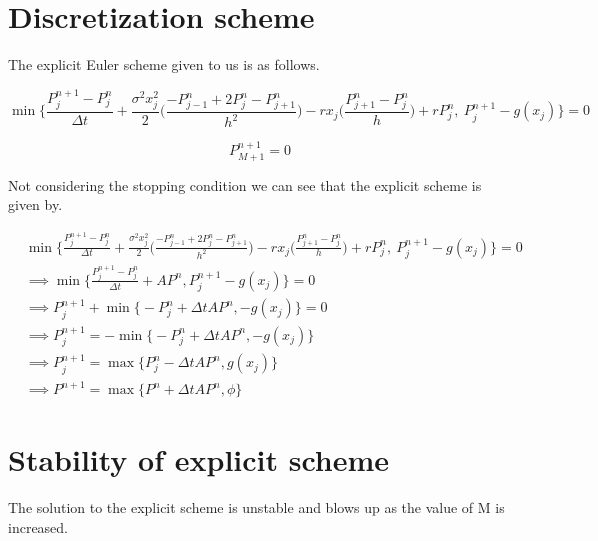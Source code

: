 \documentclass[12pt]{report}
\begin{document}
\section*{Discretization scheme}

The explicit Euler scheme given to us is as follows. 

\begin{equation*}
\min{\bigg\{\frac{P_j^{n+1}-P_j^{n}}{\Delta t}+\frac{\sigma^2x_j^2}{2}\bigg(\frac{-P^n_{j-1}+2P^n_{j}-P^n_{j+1}}{h^2}\bigg)-rx_j\bigg(\frac{P^n_{j+1}-P^n_{j}}{h}\bigg)+rP^n_{j},\ P_j^{n+1}-g(x_j)\bigg\}}=0
\end{equation*}

\begin{equation*}
P_{M+1}^{n+1}=0
\end{equation*}

Not considering the stopping condition we can see that the explicit scheme is given by. 

\begin{equation*}
	\begin{aligned}
		& \min{\bigg\{\frac{P_j^{n+1}-P_j^{n}}{\Delta t}+\frac{\sigma^2x_j^2}{2}\bigg(\frac{-P^n_{j-1}+2P^n_{j}-P^n_{j+1}}{h^2}\bigg)-rx_j\bigg(\frac{P^n_{j+1}-P^n_{j}}{h}\bigg)+rP^n_{j},\ P_j^{n+1}-g(x_j)\bigg\}}=0 \\
	    &\implies \min{\bigg\{\frac{P_j^{n+1}-P_j^{n}}{\Delta t}+AP^n,P_j^{n+1}-g(x_j)\bigg\}}=0 \\
	    &\implies P_j^{n+1}+\min{\bigg\{-P_j^{n}+\Delta tAP^n,-g(x_j)\bigg\}}=0\\
		&\implies P_j^{n+1} = - \min{\bigg\{-P_j^{n}+\Delta tAP^n,-g(x_j)\bigg\}}\\
		&\implies P_j^{n+1} = \max {\bigg\{P_j^{n}-\Delta tAP^n,g(x_j)\bigg\}}\\
		&\implies P^{n+1} = \max{\bigg\{P^{n} + \Delta t AP^{n},\phi \bigg\}}
	\end{aligned}
\end{equation*}

\section*{Stability of explicit scheme}

The solution to the explicit scheme is unstable and blows up as the value of M is increased.  
\end{document}
